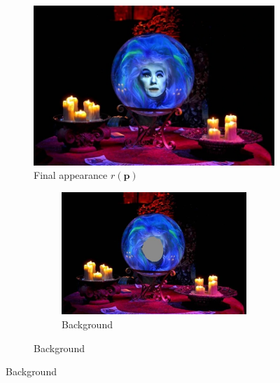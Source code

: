 \begin{figure}
    \centering
    \begin{subfigure}{0.5\textwidth}
        \centering
        \includegraphics[width=\textwidth]{images/01-Leota.jpg}
        \caption{Final appearance \(r(\bm{p})\)}
    \end{subfigure}
    \hfill
    \begin{subfigure}{0.3\textwidth}
        \centering
        \begin{subfigure}{\textwidth}
            \centering
            \includegraphics[width=\textwidth]{images/01-Leota-no_head.jpg}
            \caption{Background}
        \end{subfigure}
        

\end{subfigure}
\end{figure}
